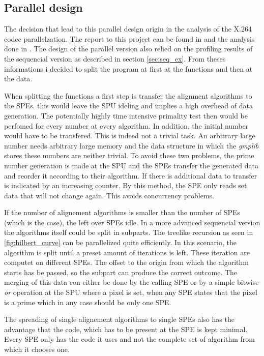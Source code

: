 \subsection{Parallel design}
\label{sec:paralleldesign}
The decision that lead to this parallel design origin in the analysis of the X.264 codec parallelzation. The report to this project can be found in \cite{BS08} and the analysis done in \cite{self}. The design of the parallel version also relied on the profiling results of the sequencial version as described in section \ref{sec:seq_ex}. From theses informations i decided to split the program at first at the functions and then at the data.

When splitting the functions a first step is transfer the alignment algorithms to the SPEs. this would leave the SPU ideling and implies a high overhead of data generation. The potentially highly time intensive primality test then would be perfomed for every number at every algorithm. In addition, the initial number would have to be transfered. This is indeed not a trivial task. An arbitrary large number needs arbitrary large memory and the data structure in which the \emph{gmplib} stores these numbers are neither trivial.
To avoid these two problems, the prime number generation is made at the SPU and the SPEs transfer the generated data and reorder it according to their algorithm. If there is additional data to transfer is indicated by an increasing counter. By this method, the SPE only reads set data that will not change again. This avoids concurrency problems.

If the number of alignement algorithms is smaller than the number of SPEs (which is the case), the left over SPEs idle. In a more advanced sequencial version the algorithms itself could be split in subparts. The treelike  recursion as seen in \ref{fig:hilbert_curve} can be parallelized quite efficiently. In this scenario, the algorithm is split until a preset amount of iterations is left. These iteration are computet on different SPEs. The offset to the origin from which the algorithm starts has be passed, so the subpart can produce the correct outcome. The merging of this data con either be done by the calling SPE or by a simple bitwise \emph{or} operation at the SPU where a pixel is set, when any SPE states that the pixel is a prime which in any case should be only one SPE.

The spreading of single alignement algorithms to single SPEs also has the advantage that the code, which has to be present at the SPE is kept minimal. Every SPE only has the code it uses and not the complete set of algorithm from which it chooses one.

